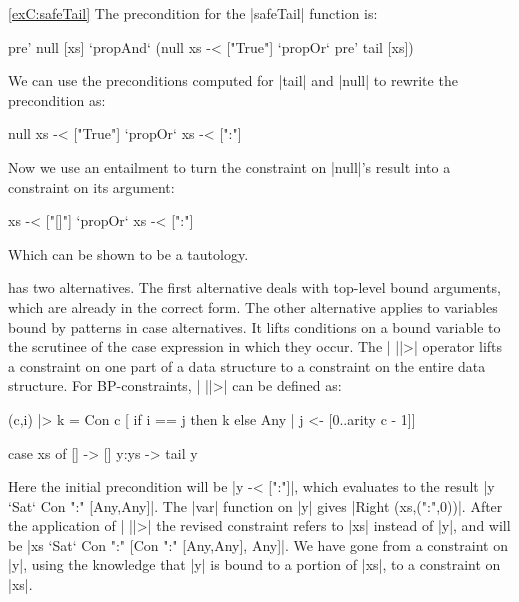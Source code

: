 \begin{examplerevisit}{\ref{exC:safeTail}}
The precondition for the |safeTail| function is:

\ignore\begin{code}
pre' null [xs] `propAnd` (null xs -< ["True"] `propOr` pre' tail [xs])
\end{code}

\noindent We can use the preconditions computed for |tail| and |null| to rewrite the precondition as:

\ignore\begin{code}
null xs -< ["True"] `propOr` xs -< [":"]
\end{code}

\noindent Now we use an entailment to turn the constraint on |null|'s result into a constraint on its argument:

\ignore\begin{code}
xs -< ["[]"] `propOr` xs -< [":"]
\end{code}

\noindent Which can be shown to be a tautology.
\end{examplerevisit}


 has two alternatives. The first alternative deals with top-level bound arguments, which are already in the correct form. The other alternative applies to variables bound by patterns in case alternatives. It lifts conditions on a bound variable to the scrutinee of the case expression in which they occur. The | ||>| operator lifts a constraint on one part of a data structure to a constraint on the entire data structure. For BP-constraints, | ||>| can be defined as:

\begin{code}
(c,i) |> k = Con c  [  if i == j then k else Any
                    |  j <- [0..arity c - 1]]
\end{code}

\begin{example}
\ignore\begin{code}
case  xs of
      []    -> []
      y:ys  -> tail y
\end{code}

Here the initial precondition will be |y -< [":"]|, which evaluates to the result |y `Sat` Con ":" [Any,Any]|. The |var| function on |y| gives |Right (xs,(":",0))|. After the application of | ||>| the revised constraint refers to |xs| instead of |y|, and will be |xs `Sat` Con ":" [Con ":" [Any,Any], Any]|. We have gone from a constraint on |y|, using the knowledge that |y| is bound to a portion of |xs|, to a constraint on |xs|.
\end{example}

